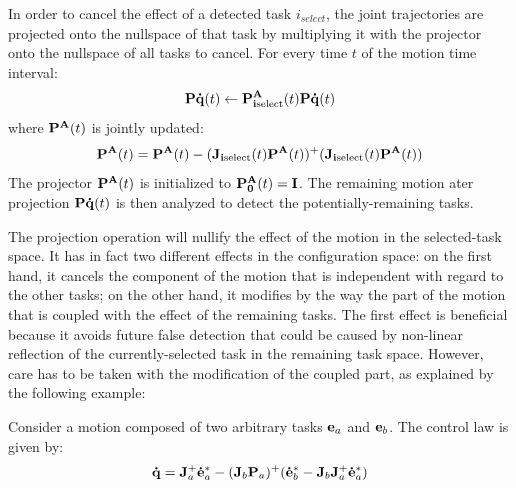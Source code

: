 \documentclass[journal]{IEEEtran}
\begin{document}
In order to cancel the effect of a detected task $i_{select}$, the joint trajectories are projected onto the nullspace
of that task by multiplying it with the projector onto the nullspace of all tasks to cancel.
For every time $t$ of the motion time interval:
\begin{equation}
  \mbf{P\dot{q}}(t) \leftarrow \mbf{P^A_{i\mathrm{select}}}(t) \mbf{P\dot{q}}(t) 
  \label{eq:projection}
\end{equation}
where $ {\mathbf{P^A}}(t)$ is jointly updated:
\begin{equation*}
  \mbf{P^A}(t) = \mbf{P^A}(t) - (\mbf{J_{i\mathrm{select}}}(t)\mbf{P^A}(t))^+(\mbf{J_{i\mathrm{select}}}(t)\mbf{P^A}(t))
  \label{eq:projectionupdate}
\end{equation*}
The projector ${\mathbf{P^A}}(t)$ is initialized to ${\mathbf{P^A_0}}(t) = {\mathbf{I}}$. The
remaining motion ater projection ${\mathbf{P\dot{q}}}(t) $ is then analyzed to
detect the potentially-remaining tasks.

The projection operation will nullify the effect of the motion in the
selected-task space. It has in fact two different effects in the configuration
space: on the first hand, it cancels the component of the motion that is
independent with regard to the other tasks; on the other hand, it modifies by
the way the part of the motion that is coupled with the effect of the remaining
tasks. The first effect is beneficial because it avoids future false
detection that could be caused by non-linear reflection of the
currently-selected task in the remaining task space. However, care has to be taken with the modification of the coupled part, as explained by the following example:

Consider a motion composed of two arbitrary tasks ${\mathbf{e}}_a$ and ${\mathbf{e}}_b$.
The control law is given by:
\begin{equation}
  \mbf{\dot{q}} = \mbf{J}_a^+\mbf{\dot{e}}_a^* - (\mbf{J}_b\mbf{P}_a)^+ (\mbf{\dot{e}}_b^* - \mbf{J}_b\mbf{J}_a^+\mbf{\dot{e}}_a^*)
  \label{eq:controlLaw2Tasks}
\end{equation}
\end{document}
